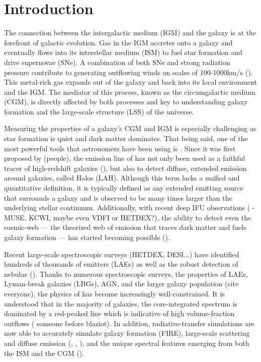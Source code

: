 \documentclass[linenumbers,amsmath,trackchanges,preprint2]{aastex702}
\begin{document}
\section{Introduction}
\par The connection between the intergalactic medium (IGM) and the galaxy is at the forefront of galactic evolution. Gas in the IGM accretes onto a galaxy and eventually flows into its interstellar medium (ISM) to fuel star formation and drive supernovae (SNe). A combination of both SNe and strong radiation pressure contribute to generating outflowing winds on scales of 100-1000km/s (\cite{?}). This metal-rich gas expands out of the galaxy and back into its local environment and the IGM. The mediator of this process, known as the circumgalactic medium (CGM), is directly affected by both processes and key to understanding galaxy formation and the large-scale structure (LSS) of the universe.
\par Measuring the properties of a galaxy's CGM and IGM is especially challenging as star formation is quiet and dark matter dominates. That being said, one of the most powerful tools that astronomers have been using is \lya. Since it was first proposed by (people), the emission line of \lya has not only been used as a faithful tracer of high-redshift galaxies (\cite{?}), but also to detect diffuse, extended emission around galaxies, called \lya Halos (LAH). Although this term lacks a unified and quantitative definition, it is typically defined as any extended \lya emitting source that surrounds a galaxy and is observed to be many times larger than the underlying stellar continuum. Additionally, with recent deep IFU observations (\cite{?} - MUSE, KCWI, maybe even VDFI or HETDEX?), the ability to detect even the cosmic-web --- the theorized web of emission that traces dark matter and fuels galaxy formation --- has started becoming possible (\cite{tornotti2025}).
\par Recent large-scale spectroscopic surveys (HETDEX, DESI...) have identified hundreds of thousands of \lya emitters (LAEs) as well as the robust detection of \lya nebulae (\cite{cooper2026}). Thanks to numerous spectroscopic surveys, the properties of LAEs, Lyman-break galaxies (LBGs), AGN, and the larger galaxy population (cite everyone), the physics of \lya has become increasingly well-constrained. It is understood that in the majority of galaxies, the core-integrated spectrum is dominated by a red-peaked \lya line which is indicative of high volume-fraction outflows (\cite{?} someone before blaziot). In addition, radiative-transfer simulations are now able to accurately simulate galaxy formation (FIRE), large-scale scattering and diffuse emission (\cite{lake2015}, \cite{byrohl2021}, \cite{byrohl2023}), and the unique spectral features emerging from both the ISM and the CGM (\cite{blaizot2023}). 
\end{document}
